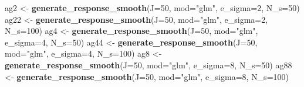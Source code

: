 \documentclass[
]{article}
\newenvironment{Shaded}{\begin{snugshade}}{\end{snugshade}}
\newcommand{\DataTypeTok}[1]{\textcolor[rgb]{0.13,0.29,0.53}{#1}}
\newcommand{\DecValTok}[1]{\textcolor[rgb]{0.00,0.00,0.81}{#1}}
\newcommand{\KeywordTok}[1]{\textcolor[rgb]{0.13,0.29,0.53}{\textbf{#1}}}
\newcommand{\NormalTok}[1]{#1}
\newcommand{\StringTok}[1]{\textcolor[rgb]{0.31,0.60,0.02}{#1}}
\begin{document}
\begin{Shaded}
\begin{Highlighting}[]
\NormalTok{ag2 <-}\StringTok{ }\KeywordTok{generate_response_smooth}\NormalTok{(}\DataTypeTok{J=}\DecValTok{50}\NormalTok{, }\DataTypeTok{mod=}\StringTok{"glm"}\NormalTok{, }\DataTypeTok{e_sigma=}\DecValTok{2}\NormalTok{, }\DataTypeTok{N_s=}\DecValTok{50}\NormalTok{)}
\NormalTok{ag22 <-}\StringTok{ }\KeywordTok{generate_response_smooth}\NormalTok{(}\DataTypeTok{J=}\DecValTok{50}\NormalTok{, }\DataTypeTok{mod=}\StringTok{"glm"}\NormalTok{, }\DataTypeTok{e_sigma=}\DecValTok{2}\NormalTok{, }\DataTypeTok{N_s=}\DecValTok{100}\NormalTok{)}
\NormalTok{ag4 <-}\StringTok{ }\KeywordTok{generate_response_smooth}\NormalTok{(}\DataTypeTok{J=}\DecValTok{50}\NormalTok{, }\DataTypeTok{mod=}\StringTok{"glm"}\NormalTok{, }\DataTypeTok{e_sigma=}\DecValTok{4}\NormalTok{, }\DataTypeTok{N_s=}\DecValTok{50}\NormalTok{)}
\NormalTok{ag44 <-}\StringTok{ }\KeywordTok{generate_response_smooth}\NormalTok{(}\DataTypeTok{J=}\DecValTok{50}\NormalTok{, }\DataTypeTok{mod=}\StringTok{"glm"}\NormalTok{, }\DataTypeTok{e_sigma=}\DecValTok{4}\NormalTok{, }\DataTypeTok{N_s=}\DecValTok{100}\NormalTok{)}
\NormalTok{ag8 <-}\StringTok{ }\KeywordTok{generate_response_smooth}\NormalTok{(}\DataTypeTok{J=}\DecValTok{50}\NormalTok{, }\DataTypeTok{mod=}\StringTok{"glm"}\NormalTok{, }\DataTypeTok{e_sigma=}\DecValTok{8}\NormalTok{, }\DataTypeTok{N_s=}\DecValTok{50}\NormalTok{)}
\NormalTok{ag88 <-}\StringTok{ }\KeywordTok{generate_response_smooth}\NormalTok{(}\DataTypeTok{J=}\DecValTok{50}\NormalTok{, }\DataTypeTok{mod=}\StringTok{"glm"}\NormalTok{, }\DataTypeTok{e_sigma=}\DecValTok{8}\NormalTok{, }\DataTypeTok{N_s=}\DecValTok{100}\NormalTok{)}


\end{Highlighting}
\end{Shaded}
\end{document}
